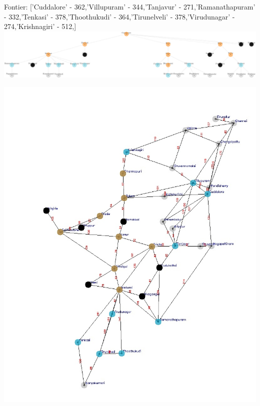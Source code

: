 \documentclass[xcolor=table]{beamer}
\begin{document}
\begin{frame}
  { \tiny Fontier: ['Cuddalore' - 362,'Villupuram' - 344,'Tanjavur' - 271,'Ramanathapuram' - 332,'Tenkasi' - 378,'Thoothukudi' - 364,'Tirunelveli' - 378,'Virudunagar' - 274,'Krishnagiri' - 512,]}
  \includegraphics[width=1\textwidth]{../UCSNodes/22-1.png}
  \begin{center}
    \includegraphics[height=0.55\textheight]{../UCSoutput/tamilUCS20.jpg}
  \end{center}
\end{frame}
\end{document}
